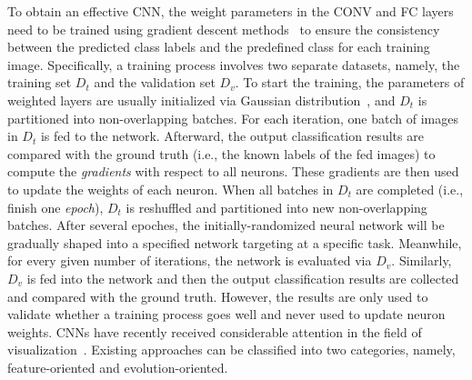 \documentclass[format=acmsmall, review=false, screen=true]{acmart}
\begin{document}
To obtain an effective CNN, the weight parameters in the CONV and FC layers need to be trained using gradient descent methods~\cite{bottou1991stochastic} to ensure the consistency between the predicted class labels and the predefined class for each training image.
Specifically, a training process involves two separate datasets, namely, the training set $\mathit{D_t}$ and the validation set $\mathit{D_v}$. 
To start the training, the parameters of weighted layers are usually initialized via Gaussian distribution~\cite{glorot2010understanding}, and $\mathit{D_t}$ is partitioned into non-overlapping batches.
For each iteration, one batch of images in $\mathit{D_t}$ is fed to the network. 
Afterward, the output classification results are compared with the ground truth (i.e., the known labels of the fed images) to compute the \textit{gradients} with respect to all neurons. 
These gradients are then used to update the weights of each neuron. 
When all batches in $\mathit{D_t}$ are completed (i.e., finish one \textit{epoch}), $D_t$ is reshuffled and partitioned into new non-overlapping batches.
After several epoches, the initially-randomized neural network will be gradually shaped into a specified network targeting at a specific task.
Meanwhile, for every given number of iterations, the network is evaluated via $\mathit{D_v}$.
Similarly, $D_v$ is fed into the network and then the output classification results are collected and compared with the ground truth.
However, the results are only used to validate whether a training process goes well and never used to update neuron weights.
CNNs have recently received considerable attention in the field of visualization~\cite{seifert2017visualizations}. 
Existing approaches can be classified into two categories, namely, feature-oriented and evolution-oriented.
\end{document}
